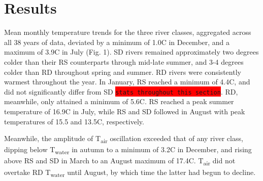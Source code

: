 \documentclass{article}
\begin{document}
\section*{Results}

Mean monthly temperature trends for the three river classes, aggregated across all 38 years of data, deviated by a minimum of 1.0\degree C in December, and a maximum of 3.9\degree C in July (Fig. 1). SD rivers remained approximately two degrees colder than their RS counterparts through mid-late summer, and 3-4 degrees colder than RD throughout spring and summer. RD rivers were consistently warmest throughout the year. In January, RS reached a minimum of 4.4\degree C, and did not significantly differ from SD \colorbox{red}{\lstinline{stats throughout this section}}. RD, meanwhile, only attained a minimum of 5.6\degree C. RS reached a peak summer temperature of 16.9\degree C in July, while RS and SD followed in August with peak temperatures of 15.5 and 13.5\degree C, respectively.

Meanwhile, the amplitude of T\textsubscript{air} oscillation exceeded that of any river class, dipping below T\textsubscript{water} in autumn to a minimum of 3.2\degree C in December, and rising above RS and SD in March to an August maximum of 17.4\degree C. T\textsubscript{air} did not overtake RD T\textsubscript{water} until August, by which time the latter had begun to decline.
\end{document}
